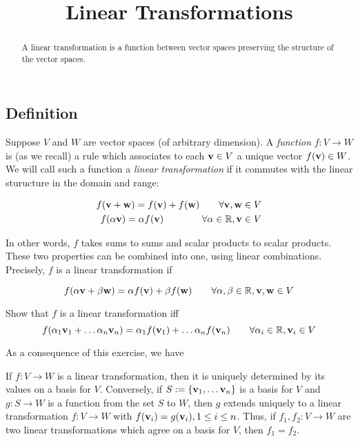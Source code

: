 \documentclass{ximera}
\title{Linear Transformations}
\begin{document}
\begin{abstract}
  A linear transformation is a function between vector spaces preserving the structure of the vector spaces.
\end{abstract}
\maketitle

\subsection{Definition} Suppose $V$ and $W$ are vector spaces (of arbitrary dimension). A {\it function} $f:V\to W$ is (as we recall) a rule which associates to each ${\bf v}\in V$ a unique vector $f({\bf v})\in W$. We will call such a function a {\it linear transformation} if it commutes with the linear sturucture in the domain and range:

\begin{eqnarray*}
f({\bf v} + {\bf w}) = f({\bf v}) + f({\bf w})\qquad\forall {\bf v,w}\in V\\
f(\alpha{\bf v}) = \alpha f({\bf v})\qquad\qquad\forall \alpha\in\mathbb R, {\bf v}\in V
\end{eqnarray*}

In other words, $f$ takes sums to sums and scalar products to scalar products. These two properties can be combined into one, using linear combinations. Precisely, $f$ is a linear transformation if

\begin{equation}
f(\alpha{\bf v} + \beta{\bf w}) = \alpha f({\bf v}) + \beta f({\bf w})\qquad\forall \alpha,\beta\in\mathbb R, {\bf v}, {\bf w}\in V
\end{equation}

\begin{exercise} Show that $f$ is a linear transformation iff
\[
f(\alpha_1{\bf v}_1 +\dots \alpha_n{\bf v}_n) = \alpha_1 f({\bf v}_1) +\dots \alpha_n f({\bf v}_n)\qquad\forall \alpha_i\in\mathbb R, {\bf v}_i\in V
\]
\end{exercise}

As a consequence of this exercise, we have

\begin{corollary} If $f: V\to W$ is a linear transformation, then it is uniquely determined by its values on a basis for $V$. Conversely, if $S := \{{\bf v}_1,\dots {\bf v}_n\}$ is a basis for $V$ and $g:S\to W$ is a function from the set $S$ to $W$, then $g$ extends uniquely to a linear transformation $f:V\to W$ with $f({\bf v}_i) = g({\bf v}_i), 1\le i\le n$. Thus, if $f_1, f_2:V\to W$ are two linear transformations which agree on a basis for $V$, then $f_1 = f_2$.
\end{corollary}
\end{document}
